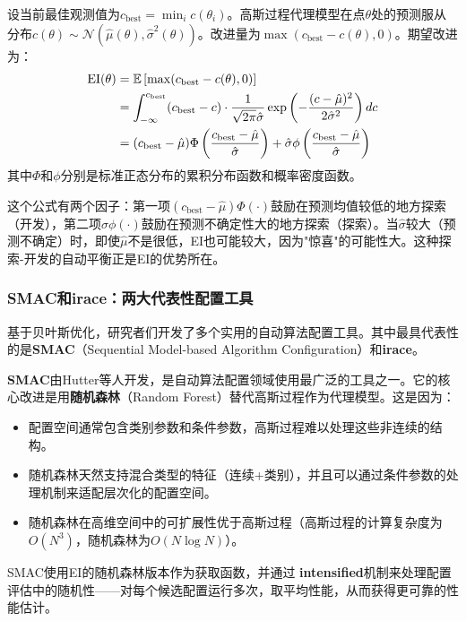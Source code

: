 \documentclass[lang=cn,zihao=-4,a4paper,fontset=windows]{beautybook}
\begin{document}
设当前最佳观测值为$c_{\text{best}} = \min_i c(\theta_i)$。高斯过程代理模型在点$\theta$处的预测服从分布$c(\theta) \sim \mathcal{N}(\hat{\mu}(\theta), \hat{\sigma}^2(\theta))$。改进量为$\max(c_{\text{best}} - c(\theta), 0)$。期望改进为：
\begin{align}
\text{EI}(\theta) &= \mathbb{E}\left[ \max(c_{\text{best}} - c(\theta), 0) \right] \notag \\
&= \int_{-\infty}^{c_{\text{best}}} (c_{\text{best}} - c) \cdot \frac{1}{\sqrt{2\pi}\hat{\sigma}} \exp\left(-\frac{(c - \hat{\mu})^2}{2\hat{\sigma}^2}\right) dc \notag \\
&= (c_{\text{best}} - \hat{\mu}) \Phi\left(\frac{c_{\text{best}} - \hat{\mu}}{\hat{\sigma}}\right) + \hat{\sigma} \phi\left(\frac{c_{\text{best}} - \hat{\mu}}{\hat{\sigma}}\right) \label{eq:EI}
\end{align}
其中$\Phi$和$\phi$分别是标准正态分布的累积分布函数和概率密度函数。

这个公式有两个因子：第一项$(c_{\text{best}} - \hat{\mu}) \Phi(\cdot)$鼓励在预测均值较低的地方探索（开发），第二项$\hat{\sigma} \phi(\cdot)$鼓励在预测不确定性大的地方探索（探索）。当$\hat{\sigma}$较大（预测不确定）时，即使$\hat{\mu}$不是很低，EI也可能较大，因为"惊喜"的可能性大。这种探索-开发的自动平衡正是EI的优势所在。

\subsubsection{SMAC和irace：两大代表性配置工具}

基于贝叶斯优化，研究者们开发了多个实用的自动算法配置工具。其中最具代表性的是\textbf{SMAC}（Sequential Model-based Algorithm Configuration）和\textbf{irace}。

\textbf{SMAC}由Hutter等人开发，是自动算法配置领域使用最广泛的工具之一。它的核心改进是用\textbf{随机森林}（Random Forest）替代高斯过程作为代理模型。这是因为：
\begin{itemize}
    \item 配置空间通常包含类别参数和条件参数，高斯过程难以处理这些非连续的结构。
    \item 随机森林天然支持混合类型的特征（连续+类别），并且可以通过条件参数的处理机制来适配层次化的配置空间。
    \item 随机森林在高维空间中的可扩展性优于高斯过程（高斯过程的计算复杂度为$O(N^3)$，随机森林为$O(N \log N)$）。
\end{itemize}

SMAC使用EI的随机森林版本作为获取函数，并通过\textbf{ intensified}机制来处理配置评估中的随机性——对每个候选配置运行多次，取平均性能，从而获得更可靠的性能估计。
\end{document}
